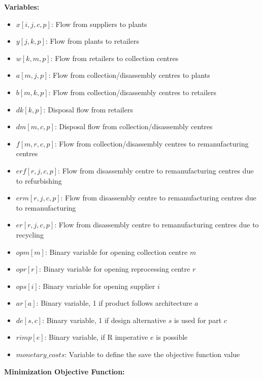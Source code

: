 \documentclass{article}
\begin{document}
    \textbf{Variables:}
    \begin{itemize}
        \item \( x[i,j,c,p] \): Flow from suppliers to plants
        \item \( y[j,k,p] \): Flow from plants to retailers
        \item \( w[k,m,p] \): Flow from retailers to collection centres
        \item \( a[m,j,p] \): Flow from collection/disassembly centres to plants
        \item \( b[m,k,p] \): Flow from collection/disassembly centres to retailers
        \item \( dk[k,p] \): Disposal flow from retailers
        \item \( dm[m,c,p] \): Disposal flow from collection/disassembly centres
        \item \( f[m,r,c,p] \): Flow from collection/disassembly centres to remanufacturing centres
        \item \( erf[r,j,c,p] \): Flow from disassembly centre to remanufacturing centres due to refurbishing
        \item \( erm[r,j,c,p] \): Flow from disassembly centre to remanufacturing centres due to remanufacturing
        \item \( er[r,j,c,p] \): Flow from disassembly centre to remanufacturing centres due to recycling
        \item \( opm[m] \): Binary variable for opening collection centre \( m \)
        \item \( opr[r] \): Binary variable for opening reprocessing centre \( r \)
        \item \( ops[i] \): Binary variable for opening supplier \( i \)
        \item \( ar[a] \): Binary variable, 1 if product follows architecture \( a \)
        \item \( de[s,c] \): Binary variable, 1 if design alternative \( s \) is used for part \( c \)
        \item \( rimp[e] \): Binary variable, if R imperative \( e \) is possible
        \item \( monetary\_costs \): Variable to define the save the objective function value
        \\
    \end{itemize}


    \textbf{Minimization Objective Function:}\\
\end{document}
